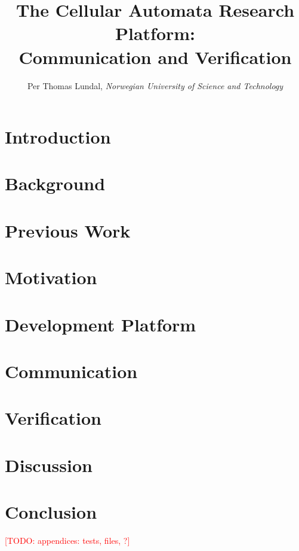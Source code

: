 \documentclass[a4paper]{IEEEtran}
\title{The Cellular Automata Research Platform: \\ Communication and Verification}
\author{Per Thomas Lundal, \emph{Norwegian University of Science and Technology}}
\newcommand\todo[1]{\textcolor{red}{[TODO: #1]}}
\begin{document}
\maketitle

\begin{abstract}

    

\end{abstract}

\section{Introduction}

    

\section{Background}

    

\section{Previous Work}

    

\section{Motivation}

    

\section{Development Platform}

    

\section{Communication}

    

\section{Verification}

    

\section{Discussion}

    

\section{Conclusion}

    




\todo{appendices: tests, files, ?}
\end{document}
